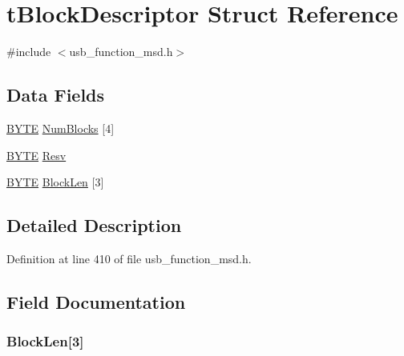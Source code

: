 \hypertarget{structt_block_descriptor}{}\section{t\+Block\+Descriptor Struct Reference}
\label{structt_block_descriptor}


{\ttfamily \#include $<$usb\+\_\+function\+\_\+msd.\+h$>$}

\subsection*{Data Fields}
\begin{DoxyCompactItemize}
\item 
\hyperlink{_generic_type_defs_8h_a4ae1dab0fb4b072a66584546209e7d58}{B\+Y\+T\+E} \hyperlink{structt_block_descriptor_a2adf3263d8a2b010e845443afec9a415}{Num\+Blocks} \mbox{[}4\mbox{]}
\item 
\hyperlink{_generic_type_defs_8h_a4ae1dab0fb4b072a66584546209e7d58}{B\+Y\+T\+E} \hyperlink{structt_block_descriptor_ae3da246d6e0668c91c5eef028d1b30c0}{Resv}
\item 
\hyperlink{_generic_type_defs_8h_a4ae1dab0fb4b072a66584546209e7d58}{B\+Y\+T\+E} \hyperlink{structt_block_descriptor_a332391d27ef37da36d91f90d9cff81e5}{Block\+Len} \mbox{[}3\mbox{]}
\end{DoxyCompactItemize}


\subsection{Detailed Description}


Definition at line 410 of file usb\+\_\+function\+\_\+msd.\+h.



\subsection{Field Documentation}
\hypertarget{structt_block_descriptor_a332391d27ef37da36d91f90d9cff81e5}{}
\subsubsection[{Block\+Len}]{ Block\+Len\mbox{[}3\mbox{]}}\label{structt_block_descriptor_a332391d27ef37da36d91f90d9cff81e5}


